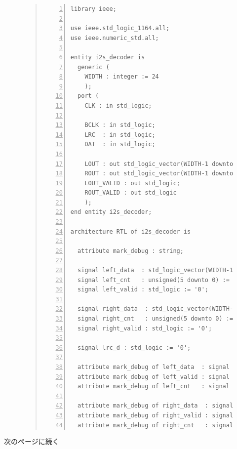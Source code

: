 \documentclass[a4paper,dvipdfmx]{jsarticle}
\begin{document}
\begin{figure}[H]
\begin{quote}
\begin{Verbatim}[frame=single, numbers=left, baselinestretch=0.8]
library ieee;

use ieee.std_logic_1164.all;
use ieee.numeric_std.all;

entity i2s_decoder is
  generic (
    WIDTH : integer := 24
    );
  port (
    CLK : in std_logic;
    
    BCLK : in std_logic;
    LRC  : in std_logic;
    DAT  : in std_logic;

    LOUT : out std_logic_vector(WIDTH-1 downto 0);
    ROUT : out std_logic_vector(WIDTH-1 downto 0);
    LOUT_VALID : out std_logic;
    ROUT_VALID : out std_logic
    );
end entity i2s_decoder;

architecture RTL of i2s_decoder is

  attribute mark_debug : string;

  signal left_data  : std_logic_vector(WIDTH-1 downto 0) := (others => '0');
  signal left_cnt   : unsigned(5 downto 0) := (others => '0');
  signal left_valid : std_logic := '0';

  signal right_data  : std_logic_vector(WIDTH-1 downto 0) := (others => '0');
  signal right_cnt   : unsigned(5 downto 0) := (others => '0');
  signal right_valid : std_logic := '0';
  
  signal lrc_d : std_logic := '0';

  attribute mark_debug of left_data  : signal is "true";
  attribute mark_debug of left_valid : signal is "true";
  attribute mark_debug of left_cnt   : signal is "true";
  
  attribute mark_debug of right_data  : signal is "true";
  attribute mark_debug of right_valid : signal is "true";
  attribute mark_debug of right_cnt   : signal is "true";

\end{Verbatim}
\end{quote}
\end{figure}
次のページに続く
\end{document}
